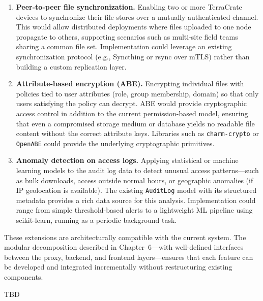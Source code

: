 \documentclass[12pt,letterpaper]{report}
\begin{document}
\begin{enumerate}
    \item \textbf{Peer-to-peer file synchronization.} Enabling two or more TerraCrate devices to synchronize their file stores over a mutually authenticated channel. This would allow distributed deployments where files uploaded to one node propagate to others, supporting scenarios such as multi-site field teams sharing a common file set. Implementation could leverage an existing synchronization protocol (e.g., Syncthing or rsync over mTLS) rather than building a custom replication layer.

    \item \textbf{Attribute-based encryption (ABE).} Encrypting individual files with policies tied to user attributes (role, group membership, domain) so that only users satisfying the policy can decrypt. ABE would provide cryptographic access control in addition to the current permission-based model, ensuring that even a compromised storage medium or database yields no readable file content without the correct attribute keys. Libraries such as \texttt{charm-crypto} or \texttt{OpenABE} could provide the underlying cryptographic primitives.

    \item \textbf{Anomaly detection on access logs.} Applying statistical or machine learning models to the audit log data to detect unusual access patterns---such as bulk downloads, access outside normal hours, or geographic anomalies (if IP geolocation is available). The existing \texttt{AuditLog} model with its structured metadata provides a rich data source for this analysis. Implementation could range from simple threshold-based alerts to a lightweight ML pipeline using scikit-learn, running as a periodic background task.
\end{enumerate}

These extensions are architecturally compatible with the current system. The modular decomposition described in Chapter~6---with well-defined interfaces between the proxy, backend, and frontend layers---ensures that each feature can be developed and integrated incrementally without restructuring existing components.

\appendix

TBD
\end{document}
